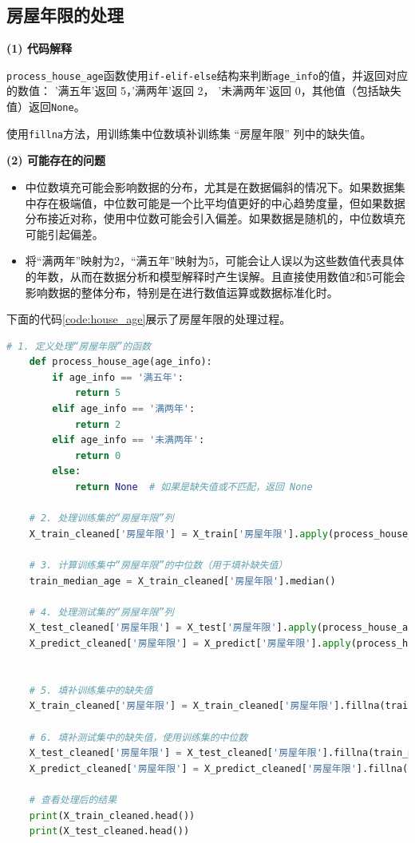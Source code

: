 \documentclass[
    report,     %
    oneside,    %
    UTF8,       %
    zihao=-4    %
]{config} %
\begin{document}
\subsection{房屋年限的处理}
\textbf{(1) 代码解释}

\lstinline|process_house_age|函数使用\lstinline|if-elif-else|结构来判断\lstinline|age_info|的值，并返回对应的数值： '满五年'返回 5，'满两年'返回 2， '未满两年'返回 0，其他值（包括缺失值）返回\lstinline|None|。

使用\lstinline|fillna|方法，用训练集中位数填补训练集 “房屋年限” 列中的缺失值。

\textbf{(2) 可能存在的问题}

\begin{itemize}
    \item 中位数填充可能会影响数据的分布，尤其是在数据偏斜的情况下。如果数据集中存在极端值，中位数可能是一个比平均值更好的中心趋势度量，但如果数据分布接近对称，使用中位数可能会引入偏差。如果数据是随机的，中位数填充可能引起偏差。
    \item 将“满两年”映射为2，“满五年”映射为5，可能会让人误以为这些数值代表具体的年数，从而在数据分析和模型解释时产生误解。且直接使用数值2和5可能会影响数据的整体分布，特别是在进行数值运算或数据标准化时。
\end{itemize}

下面的代码\ref{code:house_age}展示了房屋年限的处理过程。

\newpage
\begin{lstlisting}[label=code:house_age, language=Python, caption=房屋年限的处理代码]
    # 1. 定义处理“房屋年限”的函数
    def process_house_age(age_info):
        if age_info == '满五年':
            return 5
        elif age_info == '满两年':
            return 2
        elif age_info == '未满两年':
            return 0
        else:
            return None  # 如果是缺失值或不匹配，返回 None
    
    # 2. 处理训练集的“房屋年限”列
    X_train_cleaned['房屋年限'] = X_train['房屋年限'].apply(process_house_age)
    
    # 3. 计算训练集中“房屋年限”的中位数（用于填补缺失值）
    train_median_age = X_train_cleaned['房屋年限'].median()
    
    # 4. 处理测试集的“房屋年限”列
    X_test_cleaned['房屋年限'] = X_test['房屋年限'].apply(process_house_age)
    X_predict_cleaned['房屋年限'] = X_predict['房屋年限'].apply(process_house_age)
    
    
    # 5. 填补训练集中的缺失值
    X_train_cleaned['房屋年限'] = X_train_cleaned['房屋年限'].fillna(train_median_age)
    
    # 6. 填补测试集中的缺失值，使用训练集的中位数
    X_test_cleaned['房屋年限'] = X_test_cleaned['房屋年限'].fillna(train_median_age)
    X_predict_cleaned['房屋年限'] = X_predict_cleaned['房屋年限'].fillna(train_median_age)
    
    # 查看处理后的结果
    print(X_train_cleaned.head())
    print(X_test_cleaned.head())
\end{lstlisting}
\end{document}
